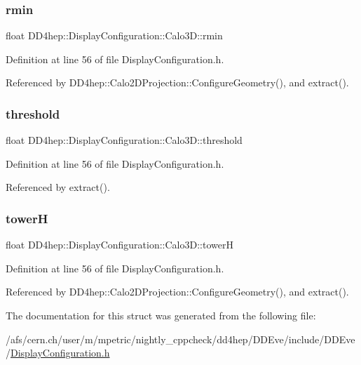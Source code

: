 \subsubsection{\texorpdfstring{rmin}{rmin}}
{\footnotesize\ttfamily float D\+D4hep\+::\+Display\+Configuration\+::\+Calo3\+D\+::rmin}



Definition at line 56 of file Display\+Configuration.\+h.



Referenced by D\+D4hep\+::\+Calo2\+D\+Projection\+::\+Configure\+Geometry(), and extract().

\hypertarget{struct_d_d4hep_1_1_display_configuration_1_1_calo3_d_a5d8b964880761613aa41ee542ce93a48}{}\label{struct_d_d4hep_1_1_display_configuration_1_1_calo3_d_a5d8b964880761613aa41ee542ce93a48} 
\subsubsection{\texorpdfstring{threshold}{threshold}}
{\footnotesize\ttfamily float D\+D4hep\+::\+Display\+Configuration\+::\+Calo3\+D\+::threshold}



Definition at line 56 of file Display\+Configuration.\+h.



Referenced by extract().

\hypertarget{struct_d_d4hep_1_1_display_configuration_1_1_calo3_d_a85221f1dde131cdf60a25bffef79325f}{}\label{struct_d_d4hep_1_1_display_configuration_1_1_calo3_d_a85221f1dde131cdf60a25bffef79325f} 
\subsubsection{\texorpdfstring{towerH}{towerH}}
{\footnotesize\ttfamily float D\+D4hep\+::\+Display\+Configuration\+::\+Calo3\+D\+::towerH}



Definition at line 56 of file Display\+Configuration.\+h.



Referenced by D\+D4hep\+::\+Calo2\+D\+Projection\+::\+Configure\+Geometry(), and extract().



The documentation for this struct was generated from the following file\+:\begin{DoxyCompactItemize}
\item 
/afs/cern.\+ch/user/m/mpetric/nightly\+\_\+cppcheck/dd4hep/\+D\+D\+Eve/include/\+D\+D\+Eve/\hyperlink{_display_configuration_8h}{Display\+Configuration.\+h}\end{DoxyCompactItemize}
